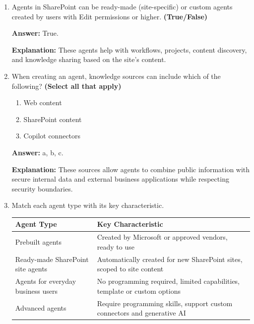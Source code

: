 \documentclass[10pt]{article}
\begin{document}
\begin{enumerate}[leftmargin=*]
\textbf{Answer:} True.

\textbf{Explanation:} Agents in Copilot Chat provide real-time support, automate responses, and predict user needs based on context.

\item Agents in SharePoint can be ready-made (site-specific) or custom agents created by users with Edit permissions or higher. \textbf{(True/False)}

\textbf{Answer:} True.

\textbf{Explanation:} These agents help with workflows, projects, content discovery, and knowledge sharing based on the site’s content.

\item When creating an agent, knowledge sources can include which of the following? \textbf{(Select all that apply)}
\begin{enumerate}[label=\alph*., leftmargin=1.5em]
\item Web content
\item SharePoint content
\item Copilot connectors
\end{enumerate}
\textbf{Answer:} a, b, c.

\textbf{Explanation:} These sources allow agents to combine public information with secure internal data and external business applications while respecting security boundaries.

\item Match each agent type with its key characteristic.

\begin{center}
\begin{tabular}{>{\raggedright\arraybackslash}p{} >{\raggedright\arraybackslash}p{}}
\toprule
\textbf{Agent Type} & \textbf{Key Characteristic} \\
\midrule
Prebuilt agents & Created by Microsoft or approved vendors, ready to use \\
Ready-made SharePoint site agents & Automatically created for new SharePoint sites, scoped to site content \\
Agents for everyday business users & No programming required, limited capabilities, template or custom options \\
Advanced agents & Require programming skills, support custom connectors and generative AI \\
\bottomrule
\end{tabular}
\end{center}


\end{enumerate}
\end{document}
